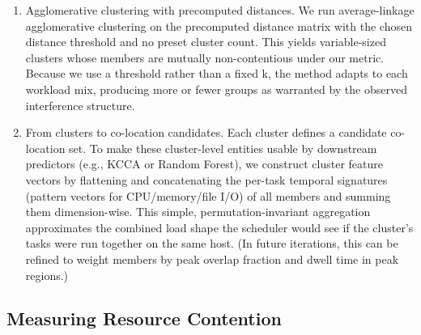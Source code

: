 \begin{enumerate}
    \item Agglomerative clustering with precomputed distances. We run average-linkage agglomerative clustering on the precomputed distance matrix with the chosen distance threshold and no preset cluster count. This yields variable-sized clusters whose members are mutually non-contentious under our metric. Because we use a threshold rather than a fixed k, the method adapts to each workload mix, producing more or fewer groups as warranted by the observed interference structure.
    \item From clusters to co-location candidates. Each cluster defines a candidate co-location set. To make these cluster-level entities usable by downstream predictors (e.g., KCCA or Random Forest), we construct cluster feature vectors by flattening and concatenating the per-task temporal signatures (pattern vectors for CPU/memory/file I/O) of all members and summing them dimension-wise. This simple, permutation-invariant aggregation approximates the combined load shape the scheduler would see if the cluster’s tasks were run together on the same host. (In future iterations, this can be refined to weight members by peak overlap fraction and dwell time in peak regions.)
\end{enumerate}

\subsection{Measuring Resource Contention}
\label{sec:measuring_resource_contention}

